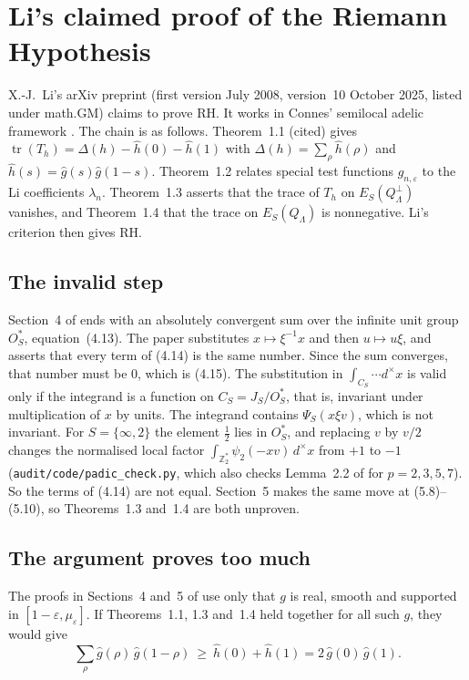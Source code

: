 \documentclass[reqno,11pt]{amsart}
\numberwithin{equation}{section}
\theoremstyle{plain}
\theoremstyle{remark}
\newcommand{\eps}{\varepsilon}
\DeclareMathOperator{\tr}{tr}
\begin{document}
\section{Li's claimed proof of the Riemann Hypothesis}\label{s:li}

X.-J.~Li's arXiv preprint \cite{Li08} (first version July 2008, version~10
October 2025, listed under math.GM) claims to prove RH. It works in Connes'
semilocal adelic framework \cite{Con99}. The chain is as follows.
Theorem~1.1 (cited) gives $\tr(T_h)=\Delta(h)-\hat h(0)-\hat h(1)$ with
$\Delta(h)=\sum_\rho\hat h(\rho)$ and $\hat h(s)=\hat g(s)\hat g(1-s)$.
Theorem~1.2 relates special test functions $g_{n,\eps}$ to the Li coefficients
$\lambda_n$. Theorem~1.3 asserts that the trace of $T_h$ on
$E_S(Q_\Lambda^{\perp})$ vanishes, and Theorem~1.4 that the trace on
$E_S(Q_\Lambda)$ is nonnegative. Li's criterion \cite{Li97} then gives RH.

\subsection{The invalid step}
Section~4 of \cite{Li08} ends with an absolutely convergent sum over the
infinite unit group $O_S^{*}$, equation~(4.13). The paper substitutes
$x\mapsto\xi^{-1}x$ and then $u\mapsto u\xi$, and asserts that every term of
(4.14) is the same number. Since the sum converges, that number must be $0$,
which is (4.15). The substitution in $\int_{C_S}\cdots d^{\times}x$ is valid only
if the integrand is a function on $C_S=J_S/O_S^{*}$, that is, invariant under
multiplication of $x$ by units. The integrand contains $\Psi_S(x\xi v)$, which
is not invariant. For $S=\{\infty,2\}$ the element $\frac12$ lies in $O_S^{*}$,
and replacing $v$ by $v/2$ changes the normalised local factor
$\int_{\mathbb Z_2^{*}}\psi_2(-xv)\,d^{\times}x$ from $+1$ to $-1$
(\texttt{audit/code/padic\_check.py}, which also checks Lemma~2.2 of
\cite{Li08} for $p=2,3,5,7$). So the terms of (4.14) are not equal. Section~5
makes the same move at (5.8)--(5.10), so Theorems~1.3 and~1.4 are both
unproven.

\subsection{The argument proves too much}
The proofs in Sections~4 and~5 of \cite{Li08} use only that $g$ is real,
smooth and supported in $[1-\eps,\mu_\eps]$. If Theorems~1.1, 1.3 and~1.4 held
together for all such $g$, they would give
\begin{equation}\label{eq:li-star}
\sum_\rho\hat g(\rho)\,\hat g(1-\rho)\ \ge\ \hat h(0)+\hat h(1)=2\,\hat g(0)\,\hat g(1).
\end{equation}
\end{document}
